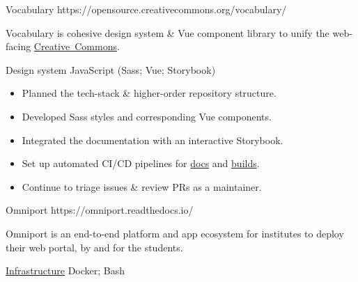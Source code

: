 

\projectsubsection
  {Vocabulary}
  {}
  {https://opensource.creativecommons.org/vocabulary/}

\begin{sectiondescription}
  Vocabulary is cohesive design system \& Vue component library to unify the
  web-facing \href{https://creativecommons.org/}{Creative~Commons}.
\end{sectiondescription}

\projectsubsubsection
  {Design system}
  {JavaScript (Sass; Vue; Storybook)}

\begin{sectiondescription}
  \begin{itemize}[nosep, leftmargin = *]
    \item Planned the tech-stack \& higher-order repository structure.
    \item Developed Sass styles and corresponding Vue components.
    \item Integrated the documentation with an interactive Storybook.
    \item Set up automated CI/CD pipelines for \href{https://opensource.creativecommons.org/vocabulary/}{docs} and \href{https://www.npmjs.com/package/@creativecommons/vocabulary}{builds}.
    \item Continue to triage issues \& review PRs as a maintainer.
  \end{itemize}
\end{sectiondescription}


\projectsubsection
  {Omniport}
  {}
  {https://omniport.readthedocs.io/}

\begin{sectiondescription}
  Omniport is an end-to-end platform and app ecosystem for institutes to deploy
  their web portal, by and for the students.
\end{sectiondescription}

\projectsubsubsection
  {\href{https://github.com/IMGIITRoorkee/omniport-docker/}{Infrastructure}}
  {Docker; Bash}


